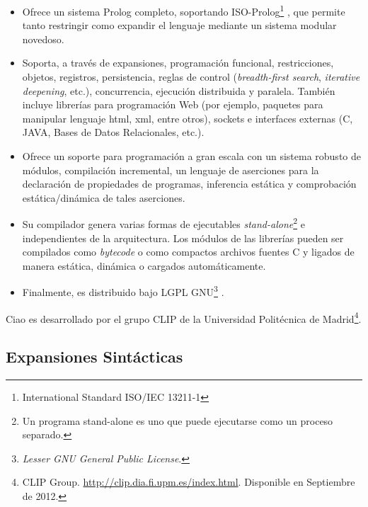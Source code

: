 	\begin{itemize}
	
	\item Ofrece un sistema Prolog completo, soportando 
        ISO-Prolog\footnote{International Standard ISO/IEC
        13211-1} \cite{gbraun:estandarprolog}, 
        que permite tanto res\-trin\-gir como expandir el lenguaje
        mediante un sistema modular novedoso.
	
	\item Soporta, a trav\'es de expansiones, programaci\'on
        funcional, restricciones, objetos, registros, 
	persistencia, reglas de control (\emph{breadth-first search}, 
        \emph{iterative deepening}, etc.), concurrencia, 
	ejecuci\'on distribuida y paralela. 
        Tambi\'en incluye librer\'ias para programaci\'on Web (por
        ejemplo, paquetes para manipular lenguaje html, xml, entre otros), sockets e 
	interfaces externas (C, JAVA, Bases de Datos Relacionales, etc.).
	
	\item Ofrece un soporte para programaci\'on a gran escala 
        con un sistema robusto de m\'odulos, compilaci\'on incremental,
        un lenguaje de aserciones para la declaraci\'on de propiedades de programas, 
	inferencia est\'atica y comprobaci\'on est\'atica/din\'amica de tales aserciones.
	
	\item Su compilador genera varias formas de ejecutables 
        \emph{stand-alone}\footnote{Un programa stand-alone
	 es uno que puede ejecutarse como un proceso separado.} e 
         independientes de la arquitectura. 
	 Los m\'odulos de las librer\'ias pueden ser compilados 
         como \emph{bytecode} o como compactos archivos fuentes C y 
         ligados de manera est\'atica, din\'amica o 
	 cargados autom\'aticamente. 
	
	\item Finalmente, es distribuido bajo LGPL 
        GNU\footnote{\emph{Lesser GNU General Public License}.} \cite{gbraun:lgpl}.
	
	\end{itemize}
	
	Ciao es desarrollado por el grupo CLIP de la Universidad
	Polit\'ecnica de Madrid\footnote{CLIP
          Group. \url{http://clip.dia.fi.upm.es/index.html}. Disponible
        en Septiembre de 2012.}.

	
	\subsection{Expansiones Sint\'acticas}
	
